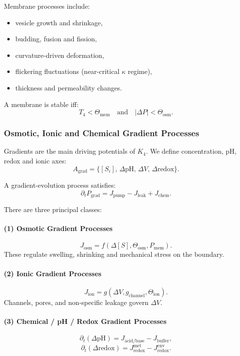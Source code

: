 Membrane processes include:
\begin{itemize}
    \item vesicle growth and shrinkage,
    \item budding, fusion and fission,
    \item curvature-driven deformation,
    \item flickering fluctuations (near-critical $\kappa$ regime),
    \item thickness and permeability changes.
\end{itemize}

A membrane is stable iff:
\[
T_4 < \Theta_{\text{mem}} \quad\text{and}\quad
|\Delta P| < \Theta_{\text{osm}}.
\]

\subsubsection{Osmotic, Ionic and Chemical Gradient Processes}

Gradients are the main driving potentials of $K_4$.  
We define concentration, pH, redox and ionic axes:
\[
A_\text{grad} = \{[S_i],\, \Delta \text{pH},\, \Delta V,\, \Delta \text{redox}\}.
\]

A gradient-evolution process satisfies:
\[
\partial_t P_\text{grad} = 
    J_{\text{pump}} - J_{\text{leak}} + J_{\text{chem}}.
\]

There are three principal classes:

\paragraph{(1) Osmotic Gradient Processes}
\[
J_{\text{osm}} = f(\Delta [S], \Theta_{\text{osm}}, P_\text{mem}).
\]
These regulate swelling, shrinking and mechanical stress on the boundary.

\paragraph{(2) Ionic Gradient Processes}
\[
J_{\text{ion}} = g(\Delta V, g_{\text{channel}}, \Theta_{\text{ion}}).
\]
Channels, pores, and non-specific leakage govern $\Delta V$.

\paragraph{(3) Chemical / pH / Redox Gradient Processes}
\[
\partial_t (\Delta \text{pH}) = J_{\text{acid/base}} 
    - J_{\text{buffer}},
\]
\[
\partial_t (\Delta \text{redox}) = J_{\text{redox}}^{\text{met}} 
    - J_{\text{redox}}^{\text{env}}.
\]

